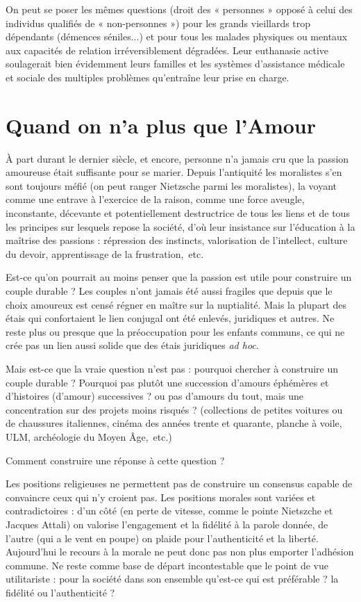  On peut se poser les mêmes questions (droit des « personnes » opposé à celui des individus qualifiés de « non-personnes ») pour les grands vieillards trop dépendants (démences séniles...) et pour tous les malades physiques ou mentaux aux capacités de relation irréversiblement dégradées. Leur euthanasie active soulagerait bien évidemment leurs familles et les systèmes d'assistance médicale et sociale des multiples problèmes qu'entraîne leur prise en charge.
 
  \section{Quand on n'a plus que l'Amour}
 
 À part durant le dernier siècle, et encore, personne n'a jamais cru que la passion amoureuse était suffisante pour se marier. Depuis l'antiquité les moralistes s'en sont toujours méfié (on peut ranger Nietzsche parmi les moralistes), la voyant comme une entrave à l'exercice de la raison, comme une force aveugle, inconstante, décevante et potentiellement destructrice de tous les liens et de tous les principes sur lesquels repose la société, d'où leur insistance sur l'éducation à la maîtrise des passions : répression des instincts, valorisation de l'intellect, culture du devoir, apprentissage de la frustration,~etc.
 
 Est-ce qu'on pourrait au moins penser que la passion est utile pour construire un couple durable ? Les couples n'ont jamais été aussi fragiles que depuis que le choix amoureux est censé régner en maître sur la nuptialité. Mais la plupart des étais qui confortaient le lien conjugal ont été enlevés, juridiques et autres. Ne reste plus ou presque que la préoccupation pour les enfants communs, ce qui ne crée pas un lien aussi solide que des étais juridiques \emph{ad hoc}.
 
 Mais est-ce que la vraie question n'est pas : pourquoi chercher à construire un couple durable ? Pourquoi pas plutôt une succession d'amours éphémères et d'histoires (d'amour) successives ? ou pas d'amours du tout, mais une concentration sur des projets moins risqués ? (collections de petites voitures ou de chaussures italiennes, cinéma des années trente et quarante, planche à voile, ULM,  archéologie du Moyen Âge,~etc.)
 
Comment construire une réponse à cette question ?

Les positions religieuses ne permettent pas de construire un consensus capable de convaincre ceux qui n'y croient pas. Les positions morales sont variées et contradictoires : d'un côté (en perte de vitesse, comme le pointe Nietszche et Jacques Attali) on valorise l'engagement et la fidélité à la parole donnée, de l'autre (qui a le vent en poupe) on plaide pour l'authenticité et la liberté. Aujourd'hui le recours à la morale ne peut donc pas non plus emporter l'adhésion commune. Ne reste comme base de départ incontestable que le point de vue utilitariste : pour la société dans son ensemble qu'est-ce qui est préférable ? la fidélité ou l'authenticité ?

